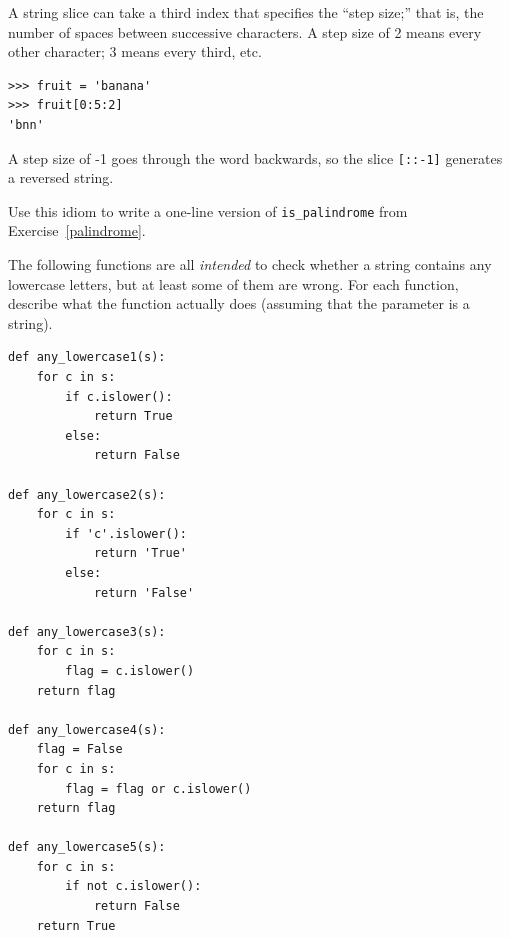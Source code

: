 \documentclass[10pt]{book}
\begin{document}
\begin{exercise}

A string slice can take a third index that specifies the ``step
size;'' that is, the number of spaces between successive characters.
A step size of 2 means every other character; 3 means every third,
etc.

\begin{verbatim}
>>> fruit = 'banana'
>>> fruit[0:5:2]
'bnn'
\end{verbatim}

A step size of -1 goes through the word backwards, so
the slice \verb"[::-1]" generates a reversed string.

Use this idiom to write a one-line version of \verb"is_palindrome"
from Exercise~\ref{palindrome}.
\end{exercise}


\begin{exercise}

The following functions are all {\em intended} to check whether a
string contains any lowercase letters, but at least some of them are
wrong.  For each function, describe what the function actually does
(assuming that the parameter is a string).

\begin{verbatim}
def any_lowercase1(s):
    for c in s:
        if c.islower():
            return True
        else:
            return False

def any_lowercase2(s):
    for c in s:
        if 'c'.islower():
            return 'True'
        else:
            return 'False'

def any_lowercase3(s):
    for c in s:
        flag = c.islower()
    return flag

def any_lowercase4(s):
    flag = False
    for c in s:
        flag = flag or c.islower()
    return flag

def any_lowercase5(s):
    for c in s:
        if not c.islower():
            return False
    return True
\end{verbatim}

\end{exercise}
\end{document}
